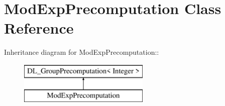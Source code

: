 \hypertarget{class_mod_exp_precomputation}{
\section{ModExpPrecomputation Class Reference}
\label{class_mod_exp_precomputation}
}
Inheritance diagram for ModExpPrecomputation::\begin{figure}[H]
\begin{center}
\leavevmode
\includegraphics[height=2cm]{class_mod_exp_precomputation}
\end{center}
\end{figure}

